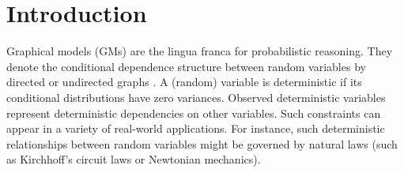 \documentclass[letterpaper]{article}
\begin{document}



\section{Introduction}
\label{sec:intro}
Graphical models (GMs) are the lingua franca for probabilistic reasoning.
They denote the conditional dependence structure between random variables by directed or undirected graphs \cite{koller2009probabilistic}. A (random) variable is deterministic if its conditional distributions have zero variances. 
Observed deterministic variables represent deterministic dependencies on other variables.
Such constraints can appear in a variety of real-world applications.
For instance, 
such deterministic relationships between random variables might be governed by natural laws 
(such as Kirchhoff's circuit laws or Newtonian mechanics).
\end{document}
